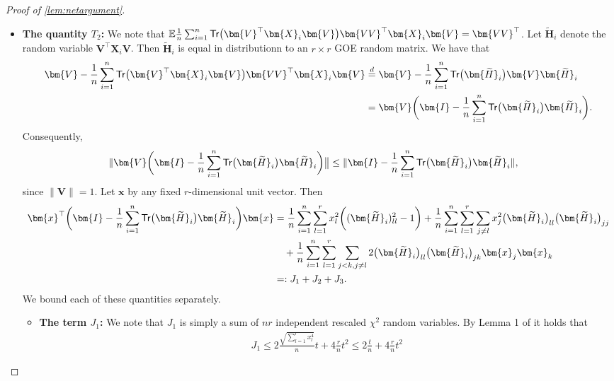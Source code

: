 \documentclass[10pt]{article}
\renewcommand{\t}{^{\top}}
\renewcommand{\tilde}{\widetilde}
\theoremstyle{definition}
\begin{document}
\begin{proof}[Proof of \cref{lem:netargument}]
\begin{itemize}
    \item \textbf{The quantity $T_2$:} We note that $\mathbb{E} \frac{1}{n} \sum_{i=1}^{n} {\sf Tr} \big( \bm{V}\t \bm{X}_i \bm{V} \big) \bm{VV}\t \bm{X}_i \bm{V} = \bm{VV}\t$.  Let $\bm{\tilde H}_i$ denote the random variable $\bm{V}\t \bm{X}_i \bm{V}$.  Then $\bm{\tilde H}_i$ is equal in distributionn to an $r\times r$ GOE random matrix.  We have that
    \begin{align}
        \bm{V} - \frac{1}{n} \sum_{i=1}^{n} {\sf Tr} \big( \bm{V}\t \bm{X}_i \bm{V} \big) \bm{VV}\t \bm{X}_i \bm{V}  &\overset{d}{=} \bm{V} -  \frac{1}{n} \sum_{i=1}^{n} {\sf Tr} \big( \bm{\tilde H}_i \big) \bm{V} \bm{\tilde H}_i \\
        &= \bm{V} \bigg( \bm{I} -   \frac{1}{n} \sum_{i=1}^{n} {\sf Tr} \big( \bm{\tilde H}_i \big)  \bm{\tilde H}_i \bigg).
    \end{align}
    Consequently,
    \begin{align}
        \| \bm{V} \bigg( \bm{I} -   \frac{1}{n} \sum_{i=1}^{n} {\sf Tr} \big( \bm{\tilde H}_i \big)  \bm{\tilde H}_i \bigg) \big\| &\leq \| \bm{I} - \frac{1}{n} \sum_{i=1}^{n} {\sf Tr} \big( \bm{\tilde H}_i \big)  \bm{\tilde H}_i \|,
    \end{align}
    since $\|\bm{V} \| = 1$.  Let $\bm{x}$ by any fixed $r$-dimensional unit vector.  Then
    \begin{align}
       \bm{x}\t \bigg( \bm{I} - \frac{1}{n} \sum_{i=1}^{n} {\sf Tr} \big( \bm{\tilde H}_i \big)  \bm{\tilde H}_i  \bigg) \bm{x} &= \frac{1}{n} \sum_{i=1}^{n} \sum_{l=1}^{r} x_l^2 \bigg( (\bm{\tilde H}_i)_{ll}^2 - 1 \bigg) + \frac{1}{n} \sum_{i=1}^{n} \sum_{l=1}^r \sum_{j \neq l} x_j^2 \big( \bm{\tilde H}_i \big)_{ll} \big( \bm{\tilde H}_i \big)_{jj} \\
       &\quad + \frac{1}{n} \sum_{i=1}^{n} \sum_{l=1}^{r} \sum_{j < k,j\neq l} 2 \big( \bm{\tilde H}_i \big)_{ll} \big( \bm{\tilde H}_i \big)_{jk} \bm{x}_j \bm{x}_k \\
       &=: J_1 + J_2 + J_3.
    \end{align}
We bound each of these quantities separately.
\begin{itemize}
    \item \textbf{The term $J_1$:} We note that $J_1$ is simply a sum of $nr$ independent rescaled $\chi^2$ random variables.   By Lemma 1 of \citet{laurent_adaptive_2000} it holds that
    \begin{align}
        J_1 \leq 2\frac{\sqrt{\sum_{l=1}^{r} x_l^4}}{n} t + 4\frac{r}{n} t^2 \leq 2 \frac{t}{n} + 4 \frac{r}{n} t^2 

\end{align}
\end{itemize}
\end{itemize}
\end{proof}
\end{document}
